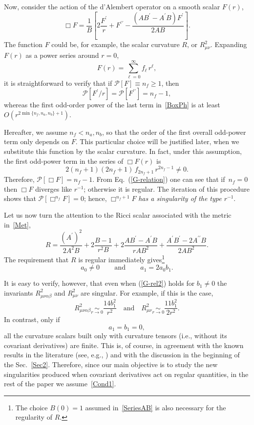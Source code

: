 \documentclass[aps,prd,a4paper,twocolumn,showpacs,showkeys,preprintnumbers,amsmath,amssymb,nofootinbib,usenames,dvipsnames]{revtex4-2}
\newcommand{\be}{\begin{eqnarray}}
\def\beq{\begin{equation}}
\def\eeq{\end{equation}}
\newcommand{\eq}[1]{(\ref{#1})}
\newcommand{\n}[1]{\label{#1}}
\def\al{\alpha}
\def\be{\beta}
\begin{document}
Now, consider the action of the d'Alembert operator on a smooth scalar $F(r)$,
%
\beq \label{BoxPh}
\Box F  = \frac{1}{B} \left[  2 \frac{F^\prime}{r} + F^{\prime\prime} - \frac{(A B^\prime - A^\prime B) F^\prime }{2 A B} \right] .
\eeq
The function $F$ could be, for example, the scalar curvature $R$, or $R_{\mu\nu}^2$.
Expanding $F(r)$ as a power series around $r=0$, 
\beq \label{SeriesPh}
F(r) = \sum_{\ell=0}^\infty f_{\ell} \, r^\ell,
\eeq
%
it is straightforward to verify that if $\mathcal{P}[F] \equiv n_f \geqslant 1$, then
$$\mathcal{P}[F^\prime/r] = \mathcal{P}[F^{\prime\prime}] = n_f-1,$$ whereas the first odd-order power of the last term in~\eqref{BoxPh} is at least $O(r^{2\min\lbrace n_f, n_a, n_b \rbrace + 1})$.

Hereafter, we assume $n_f <  n_a, n_b$, so that the order of the first overall odd-power term only depends on $F$. This particular choice will be justified later, when we substitute this function by the scalar curvature. In fact, under this assumption, the first odd-power term in the series of $\Box F(r)$ is
%
\beq
\n{G-relation}
2 (n_f+1) (2n_f+1) \, f_{2n_f+1} \, r^{2n_f-1} \neq 0.
\eeq
Therefore, $\mathcal{P}[\Box F]=n_f-1$. 
From Eq.~\eq{G-relation} one can see that if $\, n_f=0 \,$ then $\Box F$ diverges like $r^{-1}$; otherwise it is regular.
The iteration of this procedure shows that $\mathcal{P}[\Box^{n_f} F] = 0$; hence, $\Box^{n_f+1} F$ \emph{has a singularity of the type $r^{-1}$}.

Let us now turn the attention to the Ricci scalar associated with the metric in~\eqref{Met},
%
\beq \label{R}
R = \frac{(A^\prime)^2}{2 A^2 B} + 2 \frac{B-1}{r^2 B} + 2 \frac{A B^\prime - A^\prime B}{r A B^2} + \frac{A^\prime B^\prime - 2 A^{\prime\prime} B}{2 A B^2}.
\eeq
The requirement that $R$ is regular immediately gives\footnote{The choice $B(0) = 1$ assumed in~\eqref{SeriesAB} is also necessary for the regularity of $R$.}
%
\beq
\n{G-rel2}
a_0 \neq 0 \,\qquad \text{and} \qquad \, a_1 = 2 a_0 b_1.
\eeq
%

It is easy to verify, however, that even when \eq{G-rel2} holds for $b_1\neq 0$ the invariants $R_{\mu\nu\al\be}^2$ and $R_{\mu\nu}^2$ are singular. For example, if this is the case,
%
\beq
R_{\mu\nu\al\be}^2 \underset{r \to 0}{\sim} \frac{14 b_1^2}{r^2} \quad \text{and} \quad R_{\mu\nu}^2 \underset{r \to 0}{\sim} \frac{11 b_1^2}{2r^2} .
\eeq
In contrast, only if
\beq \label{Cond1} 
a_1 = b_1 = 0, 
\eeq
all the curvature scalars built only with curvature tensors (i.e., without its covariant derivatives) are finite. This is, of course, in agreement with the known results
in the literature (see, {e.g.}, \cite{Frolov:2016pav}) and with the discussion in the beginning of the Sec.~\ref{Sec2}. Therefore, since our main objective is to study
the new singularities produced when covariant derivatives act on regular quantities, in the rest of the paper we assume~\eqref{Cond1}.
\end{document}
